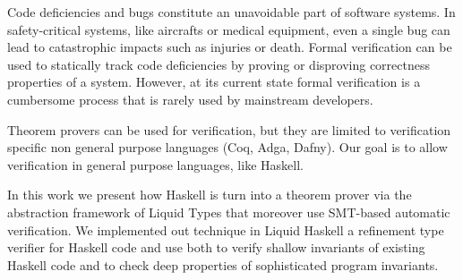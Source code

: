 Code deficiencies and bugs constitute an unavoidable part of software systems.
%
In safety-critical systems, like aircrafts or medical equipment, 
even a single bug can lead to catastrophic impacts
such as injuries or death.
%
Formal verification can be used to statically 
track code deficiencies by proving or disproving correctness properties 
of a system. 
%
However, at its current state formal verification is a cumbersome process
that is rarely used by mainstream developers. 

Theorem provers can be used for verification, 
but they are limited to  verification specific non general purpose 
languages (Coq, Adga, Dafny).
%
Our goal is to allow verification in general purpose languages, like Haskell.

In this work we present how Haskell is turn into a theorem prover
via the abstraction framework of Liquid Types
that moreover use SMT-based automatic verification. 
%
We implemented out technique in Liquid Haskell 
a refinement type verifier for Haskell code 
and use both to verify shallow invariants of existing Haskell code 
and to check deep properties of sophisticated program invariants.